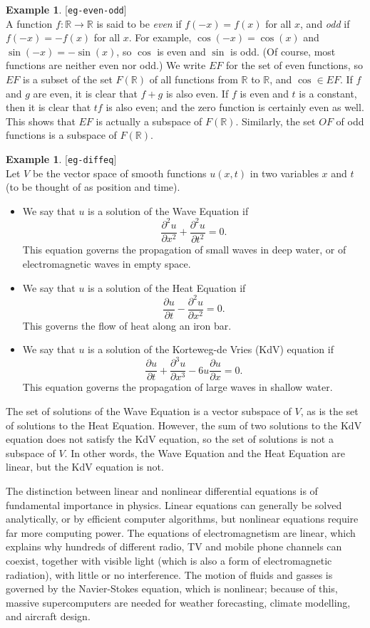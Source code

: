 \documentclass{amsart}
\newcommand{\lbl}[1]{\label{#1}\textup{[\texttt{#1}]}\ \\}
\newcommand{\lbl}{\label}
\newcommand{\R}         {{\mathbb{R}}}
\newcommand{\xra}       {\xrightarrow}
\renewcommand{\:}       {\colon}
\theoremstyle{definition}
\newtheorem{example}[theorem]{Example}
\begin{document}
\begin{example}\lbl{eg-even-odd}
 A function $f\:\R\xra{}\R$ is said to be \emph{even} if
 $f(-x)=f(x)$ for all $x$, and \emph{odd} if $f(-x)=-f(x)$
 for all $x$.  For example, $\cos(-x)=\cos(x)$ and
 $\sin(-x)=-\sin(x)$, so $\cos$ is even and $\sin$ is odd.
 (Of course, most functions are neither even nor odd.)
 We write $EF$ for the set of even functions, so $EF$ is a
 subset of the set $F(\R)$ of all functions from $\R$ to $\R$,
 and $\cos\in EF$.  If $f$ and $g$ are even, it is clear
 that $f+g$ is also even.  If $f$ is even and $t$ is a
 constant, then it is clear that $tf$ is also even; and the
 zero function is certainly even as well.  This shows that
 $EF$ is actually a subspace of $F(\R)$.  Similarly, the set
 $OF$ of odd functions is a subspace of $F(\R)$.
\end{example}


\begin{example}\lbl{eg-diffeq}
 Let $V$ be the vector space of smooth functions $u(x,t)$ in
 two variables $x$ and $t$ (to be thought of as position and
 time).
 \begin{itemize}
  \item We say that $u$ is a solution of the Wave Equation if
   \[ \frac{\partial^2 u}{\partial x^2} +
      \frac{\partial^2 u}{\partial t^2} = 0.
   \]
   This equation governs the propagation of small waves in deep
   water, or of electromagnetic waves in empty space.
  \item We say that $u$ is a solution of the Heat Equation if
   \[ \frac{\partial u}{\partial t} -
      \frac{\partial^2 u}{\partial x^2} = 0.
   \]
   This governs the flow of heat along an iron bar.
  \item We say that $u$ is a solution of the Korteweg-de Vries
   (KdV) equation  if
   \[ \frac{\partial u}{\partial t} + 
      \frac{\partial^3 u}{\partial x^3} -
      6 u\frac{\partial u}{\partial x} = 0.
   \]
   This equation governs the propagation of large waves in
   shallow water.
 \end{itemize}
 The set of solutions of the Wave Equation is a vector
 subspace of $V$, as is the set of solutions to the Heat
 Equation.  However, the sum of two solutions to the KdV
 equation does not satisfy the KdV equation, so the set of
 solutions is not a subspace of $V$.  In other words, the
 Wave Equation and the Heat Equation are linear, but the KdV
 equation is not.

 The distinction between linear and nonlinear differential
 equations is of fundamental importance in physics.  Linear
 equations can generally be solved analytically, or by
 efficient computer algorithms, but nonlinear equations
 require far more computing power.  The equations of
 electromagnetism are linear, which explains why hundreds of
 different radio, TV and mobile phone channels can coexist,
 together with visible light (which is also a form of
 electromagnetic radiation), with little or no interference.
 The motion of fluids and gasses is governed by the
 Navier-Stokes equation, which is nonlinear; because of
 this, massive supercomputers are needed for weather
 forecasting, climate modelling, and aircraft design.
\end{example}
\end{document}
